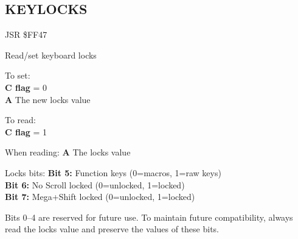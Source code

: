 \subsection{KEYLOCKS}
\label{KERNAL Jump Table!KEYLOCKS}
\begin{description}[leftmargin=2cm,style=nextline]
    \item [Address:] JSR \$FF47
    \item [Description:] Read/set keyboard locks
    \item [Inputs:]
        To set: \\
        \textbf{C flag} = 0 \\
        \textbf{A} The new locks value

        To read: \\
        \textbf{C flag} = 1
    \item [Outputs:]
        When reading:
        \textbf{A} The locks value
    \item [Remarks:]
        Locks bits:
        \textbf{Bit 5:} Function keys (0=macros, 1=raw keys) \\
        \textbf{Bit 6:} No Scroll locked (0=unlocked, 1=locked) \\
        \textbf{Bit 7:} Mega+Shift locked (0=unlocked, 1=locked)

        Bits 0--4 are reserved for future use. To maintain future compatibility, always read the locks value and preserve the values of these bits.

    \item [Example:]

\end{description}



\newpage

